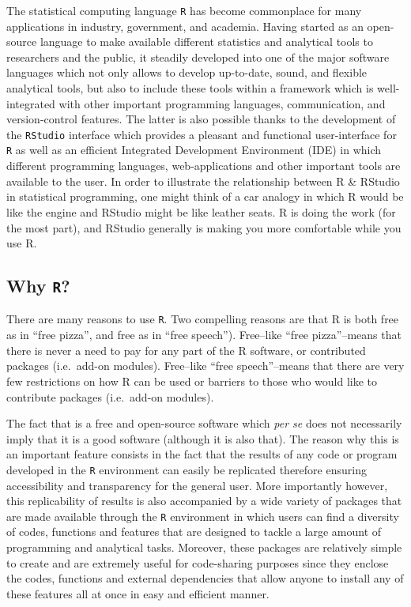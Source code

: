 \documentclass[]{book}
\theoremstyle{definition}
\theoremstyle{definition}
\theoremstyle{remark}
\begin{document}
The statistical computing language \texttt{R} has become commonplace for
many applications in industry, government, and academia. Having started
as an open-source language to make available different statistics and
analytical tools to researchers and the public, it steadily developed
into one of the major software languages which not only allows to
develop up-to-date, sound, and flexible analytical tools, but also to
include these tools within a framework which is well-integrated with
other important programming languages, communication, and
version-control features. The latter is also possible thanks to the
development of the \texttt{RStudio} interface which provides a pleasant
and functional user-interface for \texttt{R} as well as an efficient
Integrated Development Environment (IDE) in which different programming
languages, web-applications and other important tools are available to
the user. In order to illustrate the relationship between R \& RStudio
in statistical programming, one might think of a car analogy in which R
would be like the engine and RStudio might be like leather seats. R is
doing the work (for the most part), and RStudio generally is making you
more comfortable while you use R.

\subsection{\texorpdfstring{Why \texttt{R}?}{Why R?}}\label{why-r}

There are many reasons to use \texttt{R}. Two compelling reasons are
that R is both free as in ``free pizza'', and free as in ``free
speech''). Free--like ``free pizza''--means that there is never a need
to pay for any part of the R software, or contributed packages
(i.e.~add-on modules). Free--like ``free speech''--means that there are
very few restrictions on how R can be used or barriers to those who
would like to contribute packages (i.e.~add-on modules).

The fact that is a free and open-source software which \emph{per se}
does not necessarily imply that it is a good software (although it is
also that). The reason why this is an important feature consists in the
fact that the results of any code or program developed in the \texttt{R}
environment can easily be replicated therefore ensuring accessibility
and transparency for the general user. More importantly however, this
replicability of results is also accompanied by a wide variety of
packages that are made available through the \texttt{R} environment in
which users can find a diversity of codes, functions and features that
are designed to tackle a large amount of programming and analytical
tasks. Moreover, these packages are relatively simple to create and are
extremely useful for code-sharing purposes since they enclose the codes,
functions and external dependencies that allow anyone to install any of
these features all at once in easy and efficient manner.
\end{document}
